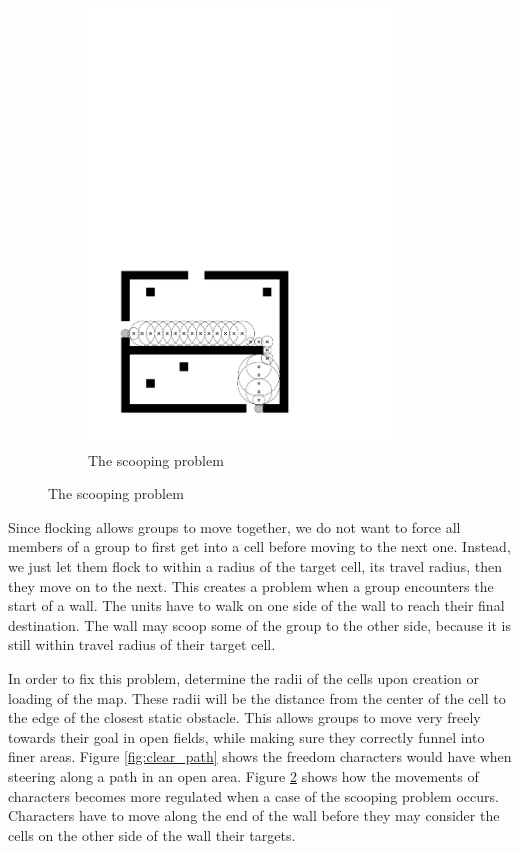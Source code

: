 \begin{figure}
%
\begin{subfigure}{0.4\textwidth}
\includegraphics[width=0.9\textwidth]{images/scoop_path1.pdf}
\caption{The scooping problem}
\label{fig:scoop_path}
\end{subfigure}
\end{figure}
Since flocking allows groups to move together, we do not want to force all members of a group to first get into a cell before moving to the next one. Instead, we just let them flock to within a radius of the target cell, its travel radius, then they move on to the next. This creates a problem when a group encounters the start of a wall. The units have to walk on one side of the wall to reach their final destination. The wall may scoop some of the group to the other side, because it is still within travel radius of their target cell.

In order to fix this problem, determine the radii of the cells upon creation or loading of the map. These radii will be the distance from the center of the cell to the edge of the closest static obstacle. This allows groups to move very freely towards their goal in open fields, while making sure they correctly funnel into finer areas. Figure \ref{fig:clear_path} shows the freedom characters would have when steering along a path in an open area. Figure \ref{fig:scoop_path} shows how the movements of characters becomes more regulated when a case of the scooping problem occurs. Characters have to move along the end of the wall before they may consider the cells on the other side of the wall their targets.


